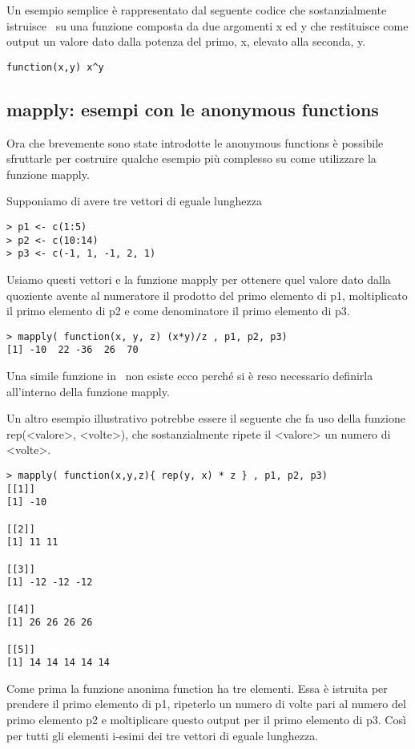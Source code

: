 Un esempio semplice è rappresentato dal seguente codice che sostanzialmente istruisce \erre\ su una funzione composta da due argomenti x ed y che restituisce come output un valore dato dalla potenza del primo, x, elevato alla seconda, y.

\begin{lstlisting}
function(x,y) x^y
\end{lstlisting}


\subsection{mapply: esempi con le anonymous functions}

Ora che brevemente sono state introdotte le anonymous functions è possibile sfruttarle per costruire qualche esempio più complesso su come utilizzare la funzione \textsf{mapply}.

Supponiamo di avere tre vettori di eguale lunghezza 
\begin{lstlisting}
> p1 <- c(1:5)
> p2 <- c(10:14)
> p3 <- c(-1, 1, -1, 2, 1)
\end{lstlisting}

Usiamo questi vettori e la funzione \textsf{mapply} per ottenere quel valore dato dalla quoziente avente al numeratore il prodotto del primo elemento di p1, moltiplicato il primo elemento di p2 e come denominatore il primo elemento di p3.

\begin{lstlisting}
> mapply( function(x, y, z) (x*y)/z , p1, p2, p3)
[1] -10  22 -36  26  70
\end{lstlisting}

Una simile funzione in \erre\ non esiste ecco perché si è reso necessario definirla all'interno della funzione \textsf{mapply}.

Un altro esempio illustrativo potrebbe essere il seguente che fa uso della funzione \textsf{rep(<valore>, <volte>)}, che sostanzialmente ripete il <valore> un numero di <volte>.
\begin{lstlisting}
> mapply( function(x,y,z){ rep(y, x) * z } , p1, p2, p3)
[[1]]
[1] -10

[[2]]
[1] 11 11

[[3]]
[1] -12 -12 -12

[[4]]
[1] 26 26 26 26

[[5]]
[1] 14 14 14 14 14
\end{lstlisting}

Come prima la funzione anonima function ha tre elementi. Essa è istruita per prendere il primo elemento di p1, ripeterlo un numero di volte pari al numero del primo elemento p2 e moltiplicare questo output per il primo elemento di p3. Così per tutti gli elementi i-esimi dei tre vettori di eguale lunghezza.

